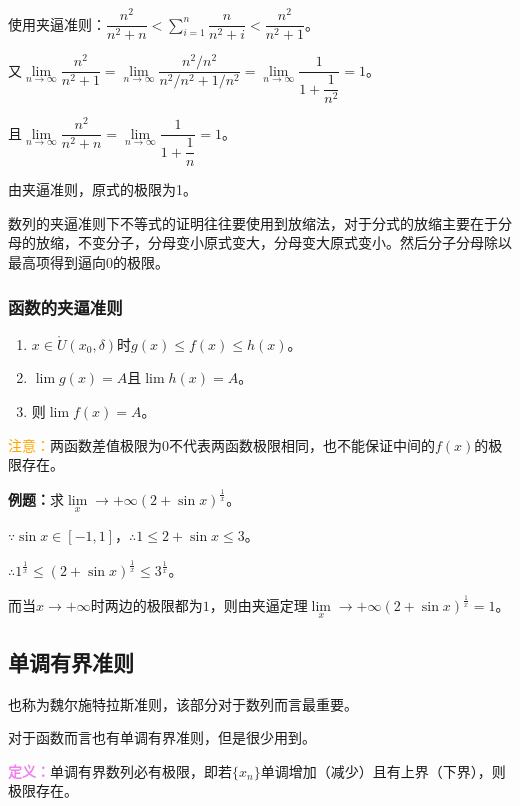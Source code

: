 \documentclass[UTF8, 12pt]{ctexart}
\begin{document}
    使用夹逼准则：$\dfrac{n^2}{n^2+n}<\sum_{i=1}^n\dfrac{n}{n^2+i}<\dfrac{n^2}{n^2+1}$。

    又$\lim\limits_{n\to\infty}\dfrac{n^2}{n^2+1}=\lim\limits_{n\to\infty}\dfrac{n^2/n^2}{n^2/n^2+1/n^2}=\lim\limits_{n\to\infty}\dfrac{1}{1+\dfrac{1}{n^2}}=1$。

    且$\lim\limits_{n\to\infty}\dfrac{n^2}{n^2+n}=\lim\limits_{n\to\infty}\dfrac{1}{1+\dfrac{1}{n}}=1$。

    由夹逼准则，原式的极限为1。

    数列的夹逼准则下不等式的证明往往要使用到放缩法，对于分式的放缩主要在于分母的放缩，不变分子，分母变小原式变大，分母变大原式变小。然后分子分母除以最高项得到逼向0的极限。

    \subsubsection{函数的夹逼准则}

    \begin{enumerate}
        \item $x\in\mathring{U}(x_0,\delta)$时$g(x)\leqslant f(x)\leqslant h(x)$。
        \item $\lim g(x)=A$且$\lim h(x)=A$。
        \item 则$\lim f(x)=A$。
    \end{enumerate}

    \textcolor{orange}{注意：}两函数差值极限为0不代表两函数极限相同，也不能保证中间的$f(x)$的极限存在。

    \textbf{例题：}求$\lim\limits_x\to+\infty(2+\sin x)^{\frac{1}{x}}$。

    $\because \sin x\in[-1,1]$，$\therefore 1\leqslant 2+\sin x\leqslant 3$。

    $\therefore 1^{\frac{1}{x}}\leqslant\left(2+\sin x\right)^{\frac{1}{x}}\leqslant 3^{\frac{1}{x}}$。

    而当$x\to+\infty$时两边的极限都为$1$，则由夹逼定理$\lim\limits_x\to+\infty(2+\sin x)^{\frac{1}{x}}=1$。

    \subsection{单调有界准则}

    也称为魏尔施特拉斯准则，该部分对于数列而言最重要。

    对于函数而言也有单调有界准则，但是很少用到。

    \textcolor{violet}{\textbf{定义：}}单调有界数列必有极限，即若$\{x_n\}$单调增加（减少）且有上界（下界），则极限存在。
\end{document}
